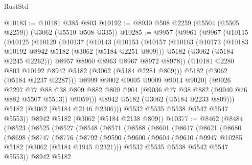 \begin{lexlean}{RustStd}
\begin{coremodule}
@10183 := @10181 @385 @803
@10192 := @8930 @508 @2259 (@5504 (@5505 @2259)) (@3062 (@5510 @508 @335))
@10285 := @9957
    (@9961
      (@9967
        (@10115
          (@10125
            (@10129
              (@10137
                (@10143
                  (@10153
                    (@10157
                      (@10163
                        (@10173
                          (@10183 @10192 @8942 @5182 (@3062 (@5184 @2251 @809)))
                          @5182
                          (@3062 (@5184 @2245 @2262)))
                        @8957
                        @8960
                        @8963
                        @8967
                        @8972
                        @8978))
                    (@10181 @2280 @803 @10192 @8942 @5182 (@3062 (@5184 @2281 @809)))
                    @5182
                    (@3062 (@5184 @2237 @2287)))
                  @8999
                  @9002
                  @9005
                  @9009
                  @9014
                  @9020)
                (@9026
                  @2297
                  @77
                  @88
                  @38
                  @809
                  @882
                  @809
                  @904
                  (@9036 @77 @38 @882 (@9040 @76 @882 @5507 @5513))
                  @9059)))
            @8942
            @5182
            (@3062 (@5184 @2233 @809)))
          @5182
          (@3062 (@5184 @2146 @2306)))
        @5532
        @5535
        @5538
        @5542
        @5547
        @5553))
    @8942
    @5182
    (@3062 (@5184 @2138 @809))
@10377 := @8462
    (@8484
      (@8523
        (@8525
          (@8527
            (@8548
              (@8571
                (@8588
                  (@8601
                    (@8617
                      (@8621
                        (@8680
                          (@8698
                            (@8747
                              (@8776
                                (@8792
                                  (@9590
                                    (@9600
                                      (@9604
                                        (@9610
                                          (@9947 @10285 @5182 (@3062 (@5184 @1945 @2321)))
                                          @5532
                                          @5535
                                          @5538
                                          @5542
                                          @5547
                                          @5553))
                                      @8942
                                      @5182

\end{coremodule}
\end{lexlean}
